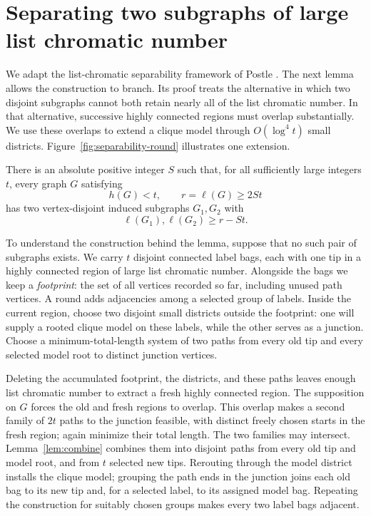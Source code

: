 \section{Separating two subgraphs of large list chromatic number}
\label{sec:separability}

We adapt the list-chromatic separability framework of Postle
\cite[Definition~2.4 and Lemmas~2.5--2.6]{Postle2020}.
The next lemma allows the construction to branch. Its proof treats the
alternative in which two disjoint subgraphs cannot both retain nearly all
of the list chromatic number. In that alternative, successive highly
connected regions must overlap substantially. We use these overlaps to
extend a clique model through \(O(\log^4t)\) small districts.
Figure~\ref{fig:separability-round} illustrates one extension.

\begin{lemma}[Separability]
\label{lem:separability}
There is an absolute positive integer \(S\) such that, for all sufficiently
large integers \(t\), every graph \(G\) satisfying
\[
 h(G)<t,\qquad r=\ell(G)\ge 2St
\]
has two vertex-disjoint induced subgraphs \(G_1,G_2\) with
\[
 \ell(G_1),\ell(G_2)\ge r-St.
\]
\end{lemma}

To understand the construction behind the lemma, suppose that no such
pair of subgraphs exists. We carry \(t\) disjoint connected label bags,
each with one tip in a highly connected region of large list chromatic
number. Alongside the bags we keep a \emph{footprint}: the set of all
vertices recorded so far, including unused path vertices. A round adds
adjacencies among a selected group of labels. Inside the current region,
choose two disjoint small districts outside the footprint: one will
supply a rooted clique model on these labels, while the other serves
as a junction. Choose a minimum-total-length system of two paths from
every old tip and every selected model root to distinct junction vertices.

Deleting the accumulated footprint, the districts, and these paths
leaves enough list chromatic number to extract a fresh highly connected
region. The supposition on \(G\) forces the old and fresh regions to
overlap. This overlap makes a second family of \(2t\) paths to the
junction feasible, with distinct freely chosen starts in the fresh
region; again minimize their total length. The two families may
intersect. Lemma~\ref{lem:combine} combines them into disjoint paths
from every old tip and model root, and from \(t\) selected new tips.
Rerouting through the model district installs the clique model;
grouping the path ends in the junction joins each old bag to its new
tip and, for a selected label, to its assigned model bag. Repeating the
construction for suitably chosen groups makes every two label bags
adjacent.

